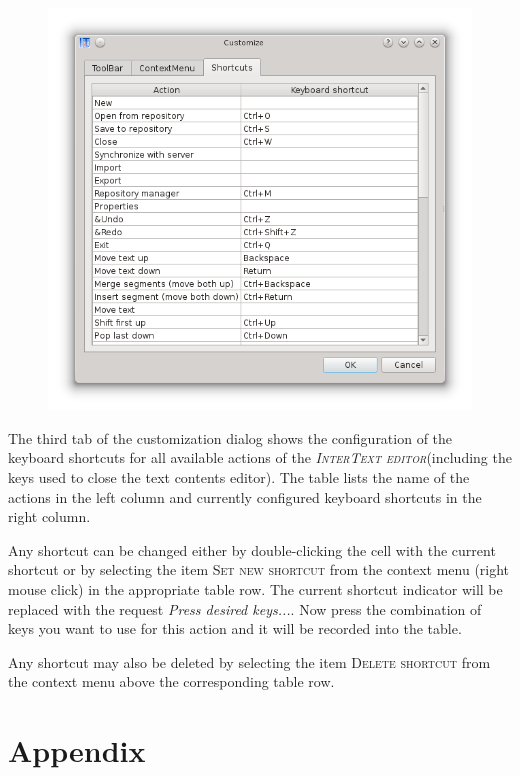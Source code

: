 \documentclass[a4paper,10pt,oneside]{book}
\newcommand{\ITeditor}{\textit{\textsc{InterText editor}}\xspace}
\newcommand{\menu}[1]{\textsc{#1}}
\begin{document}
\begin{figure}[htb]
 \includegraphics[width=\textwidth]{screenshots/customize_shortcuts.png}
\end{figure}

The third tab of the customization dialog shows the configuration of the keyboard shortcuts for all available actions of the \ITeditor (including the keys used to close the text contents editor). The table lists the name of the actions in the left column and currently configured keyboard shortcuts in the right column.

Any shortcut can be changed either by double-clicking the cell with the current shortcut or by selecting the item \menu{Set new shortcut} from the context menu (right mouse click) in the appropriate table row. The current shortcut indicator will be replaced with the request \textit{Press desired keys...}. Now press the combination of keys you want to use for this action and it will be recorded into the table.

Any shortcut may also be deleted by selecting the item \menu{Delete shortcut} from the context menu above the corresponding table row.

\appendix
\part{Appendix}\label{ch:technical}
\end{document}
